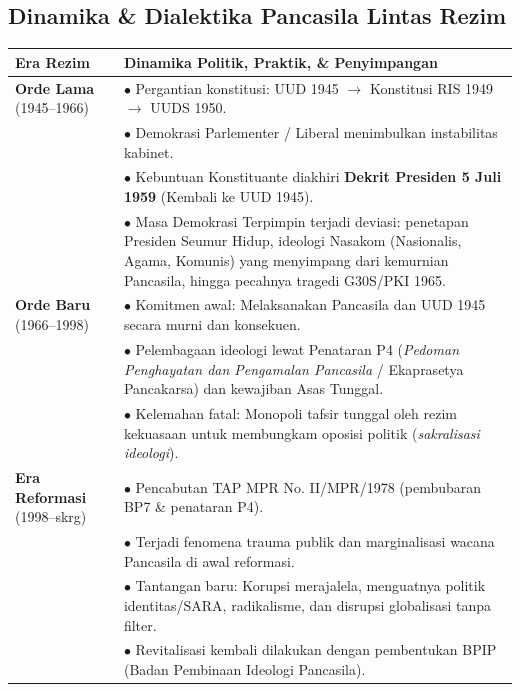 \documentclass[10pt,a4paper]{article}
\begin{document}
\subsection{Dinamika \& Dialektika Pancasila Lintas Rezim}
\begin{tabularx}{\linewidth}{lX}
  \toprule
  \textbf{Era Rezim} & \textbf{Dinamika Politik, Praktik, \& Penyimpangan} \\
  \midrule
  \textbf{Orde Lama} (1945--1966) &
  $\bullet$ Pergantian konstitusi: UUD 1945 $\rightarrow$ Konstitusi RIS 1949 $\rightarrow$ UUDS 1950.\\
  & $\bullet$ Demokrasi Parlementer / Liberal menimbulkan instabilitas kabinet.\\
  & $\bullet$ Kebuntuan Konstituante diakhiri \textbf{Dekrit Presiden 5 Juli 1959} (Kembali ke UUD 1945).\\
  & $\bullet$ Masa Demokrasi Terpimpin terjadi deviasi: penetapan Presiden Seumur Hidup, ideologi Nasakom (Nasionalis, Agama, Komunis) yang menyimpang dari kemurnian Pancasila, hingga pecahnya tragedi G30S/PKI 1965. \\
  \midrule
  \textbf{Orde Baru} (1966--1998) &
  $\bullet$ Komitmen awal: Melaksanakan Pancasila dan UUD 1945 secara murni dan konsekuen.\\
  & $\bullet$ Pelembagaan ideologi lewat Penataran P4 (\textit{Pedoman Penghayatan dan Pengamalan Pancasila} / Ekaprasetya Pancakarsa) dan kewajiban Asas Tunggal.\\
  & $\bullet$ Kelemahan fatal: Monopoli tafsir tunggal oleh rezim kekuasaan untuk membungkam oposisi politik (\textit{sakralisasi ideologi}). \\
  \midrule
  \textbf{Era Reformasi} (1998--skrg) &
  $\bullet$ Pencabutan TAP MPR No. II/MPR/1978 (pembubaran BP7 \& penataran P4).\\
  & $\bullet$ Terjadi fenomena trauma publik dan marginalisasi wacana Pancasila di awal reformasi.\\
  & $\bullet$ Tantangan baru: Korupsi merajalela, menguatnya politik identitas/SARA, radikalisme, dan disrupsi globalisasi tanpa filter.\\
  & $\bullet$ Revitalisasi kembali dilakukan dengan pembentukan BPIP (Badan Pembinaan Ideologi Pancasila). \\
  \bottomrule
\end{tabularx}
\end{document}
